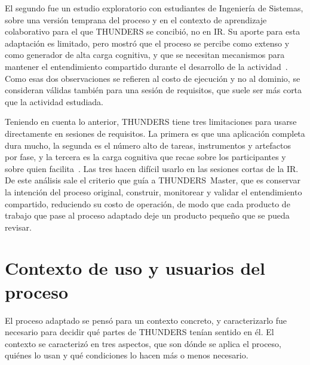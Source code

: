 \documentclass[12pt,letterpaper,oneside]{report}
\begin{document}
El segundo fue un estudio exploratorio con estudiantes de Ingeniería de
Sistemas, sobre una versión temprana del proceso y en el contexto de
aprendizaje colaborativo para el que THUNDERS se concibió, no en
IR. Su aporte para esta adaptación es limitado, pero mostró que el proceso se percibe como extenso y como
generador de alta carga cognitiva, y que se necesitan mecanismos para mantener
el entendimiento compartido durante el desarrollo de la actividad~\cite{agredo2022exploratory}. Como esas dos
observaciones se refieren al costo de ejecución y no al dominio, se consideran
válidas también para una sesión de requisitos, que suele ser más corta que la
actividad estudiada.

Teniendo en cuenta lo anterior, THUNDERS tiene tres limitaciones para usarse
directamente en sesiones de requisitos. La primera es que una aplicación
completa dura mucho, la segunda es el número alto de tareas, instrumentos y
artefactos por fase, y la tercera es la carga cognitiva que recae
sobre los participantes y sobre quien facilita~\cite{sweller1988,dejong2010}.
Las tres hacen difícil usarlo en las sesiones cortas de la IR. De este análisis
sale el criterio que guía a THUNDERS~Master, que es conservar la intención del
proceso original, construir, monitorear y validar el entendimiento compartido,
reduciendo su costo de operación, de modo que cada producto de trabajo que pase al
proceso adaptado deje un producto pequeño que se pueda revisar.


\section{Contexto de uso y usuarios del proceso}
\label{sec:contexto_uso}
El proceso adaptado se pensó para un contexto concreto, y caracterizarlo fue necesario para decidir qué partes de THUNDERS
tenían sentido en él. El contexto se caracterizó en tres aspectos, que son
dónde se aplica el proceso, quiénes lo usan y qué condiciones lo hacen más o
menos necesario.
\end{document}
